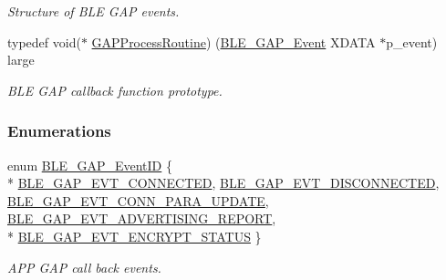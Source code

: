 \begin{DoxyCompactItemize}
\begin{DoxyCompactList}\small\item\em Structure of B\+LE G\+AP events. \end{DoxyCompactList}\item 
typedef void($\ast$ \hyperlink{group___b_l_e___g_a_p_ga239e1eed98ed57692459e70cad9d7021}{G\+A\+P\+Process\+Routine}) (\hyperlink{struct_b_l_e___g_a_p___event}{B\+L\+E\+\_\+\+G\+A\+P\+\_\+\+Event} X\+D\+A\+TA $\ast$p\+\_\+event) large\hypertarget{group___b_l_e___g_a_p_ga239e1eed98ed57692459e70cad9d7021}{}\label{group___b_l_e___g_a_p_ga239e1eed98ed57692459e70cad9d7021}

\begin{DoxyCompactList}\small\item\em B\+LE G\+AP callback function prototype. \end{DoxyCompactList}\end{DoxyCompactItemize}
\subsubsection*{Enumerations}
\begin{DoxyCompactItemize}
\item 
enum \hyperlink{group___b_l_e___g_a_p_gab40cc5a5c434d2d7d9cb7c22634f7b61}{B\+L\+E\+\_\+\+G\+A\+P\+\_\+\+Event\+ID} \{ \\*
\hyperlink{group___b_l_e___g_a_p_ggab40cc5a5c434d2d7d9cb7c22634f7b61aa0b4789724d202a13a5e7eab85c52957}{B\+L\+E\+\_\+\+G\+A\+P\+\_\+\+E\+V\+T\+\_\+\+C\+O\+N\+N\+E\+C\+T\+ED}, 
\hyperlink{group___b_l_e___g_a_p_ggab40cc5a5c434d2d7d9cb7c22634f7b61a057001bbd6ea9e615f19ef93cc0831ee}{B\+L\+E\+\_\+\+G\+A\+P\+\_\+\+E\+V\+T\+\_\+\+D\+I\+S\+C\+O\+N\+N\+E\+C\+T\+ED}, 
\hyperlink{group___b_l_e___g_a_p_ggab40cc5a5c434d2d7d9cb7c22634f7b61a5333fbd5e04eafa5a008164eba888fdc}{B\+L\+E\+\_\+\+G\+A\+P\+\_\+\+E\+V\+T\+\_\+\+C\+O\+N\+N\+\_\+\+P\+A\+R\+A\+\_\+\+U\+P\+D\+A\+TE}, 
\hyperlink{group___b_l_e___g_a_p_ggab40cc5a5c434d2d7d9cb7c22634f7b61a0bac4d78e3d37e33a8f97c80c66ab55e}{B\+L\+E\+\_\+\+G\+A\+P\+\_\+\+E\+V\+T\+\_\+\+A\+D\+V\+E\+R\+T\+I\+S\+I\+N\+G\+\_\+\+R\+E\+P\+O\+RT}, 
\\*
\hyperlink{group___b_l_e___g_a_p_ggab40cc5a5c434d2d7d9cb7c22634f7b61ad3a92d6983b0b7d79b25a07b8ed23e4a}{B\+L\+E\+\_\+\+G\+A\+P\+\_\+\+E\+V\+T\+\_\+\+E\+N\+C\+R\+Y\+P\+T\+\_\+\+S\+T\+A\+T\+US}
 \}\begin{DoxyCompactList}\small\item\em A\+PP G\+AP call back events. \end{DoxyCompactList}
\end{DoxyCompactItemize}
